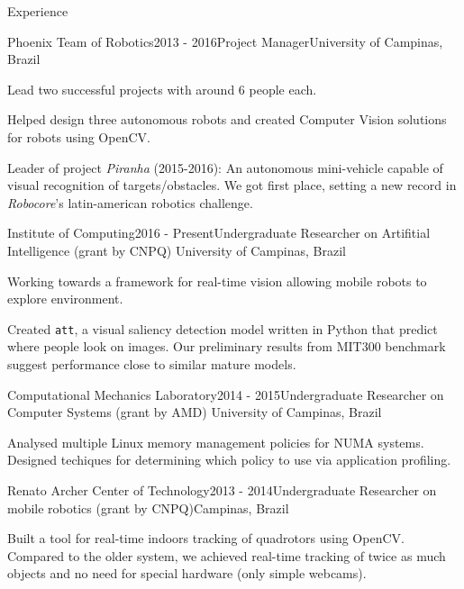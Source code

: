\documentclass[8pt]{resume}
\newcommand{\tit}[1]{\textit{#1}}
\newcommand{\ttt}[1]{\texttt{#1}}
\begin{document}
\begin{rSection}{Experience}

\begin{rSubsection}{Phoenix Team of Robotics}{2013 - 2016}{Project Manager}{University of Campinas, Brazil}
    \item Lead two successful projects with around 6 people each.
    \item Helped design three autonomous robots and
        created Computer Vision solutions for robots using OpenCV.
    \item Leader of project \tit{Piranha} (2015-2016):
        An autonomous mini-vehicle capable of visual recognition of
        targets/obstacles.
        We got first place, setting a new record in \tit{Robocore}'s
        latin-american
        robotics challenge.
\end{rSubsection}

\begin{rSubsection}{Institute of Computing}{2016 - Present}{Undergraduate Researcher on Artifitial Intelligence (grant by CNPQ)}
    {University of Campinas, Brazil}
    \item Working towards a framework for real-time vision
        allowing mobile robots to explore environment.
    \item Created \ttt{att}, a visual saliency detection model written in
        Python that predict where people look on images.
        Our preliminary results from MIT300 benchmark suggest performance
        close to similar mature models.
\end{rSubsection}

\begin{rSubsection}{Computational Mechanics Laboratory}{2014 - 2015}{Undergraduate Researcher on Computer Systems (grant by AMD)}
    {University of Campinas, Brazil}
    \item Analysed multiple Linux memory management policies for NUMA systems.
        Designed techiques for determining which policy
        to use via application profiling.
\end{rSubsection}

\begin{rSubsection}{Renato Archer Center of Technology}{2013 - 2014}{Undergraduate Researcher on mobile robotics (grant by CNPQ)}{Campinas, Brazil}
    \item Built a tool for real-time indoors tracking of
        quadrotors using OpenCV\@. Compared to the older system,
        we achieved real-time tracking of twice as much objects
        and no need for special hardware (only simple webcams).
\end{rSubsection}

\end{rSection}
\end{document}
